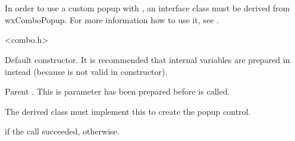 
\section{}\label{wxcombopopup}

In order to use a custom popup with ,
an interface class must be derived from wxComboPopup. For more information
how to use it, see .


<combo.h>





\label{wxcombopopupwxcombopopup}


Default constructor. It is recommended that internal variables
are prepared in  instead
(because  is not valid in constructor).


\label{wxcombopopupmcombo}


Parent . This is parameter has
been prepared before  is called.


\label{wxcombopopupcreate}


The derived class must implement this to create the popup control.


\true if the call succeeded, \false otherwise.


\label{wxcombopopupdismiss}

